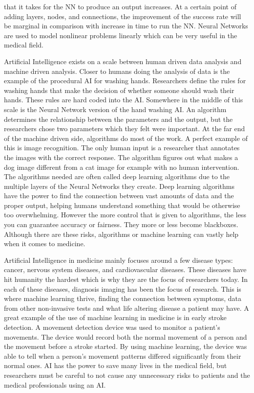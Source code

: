 \documentclass[]{article}
\begin{document}
that it takes for the NN to produce an output increases. At a certain point of adding layers, nodes, and connections, the improvement of the success rate will be marginal in comparison with increase in time to run the NN. Neural Networks are used to model nonlinear problems linearly which can be very useful in the medical field.\cite{introtoneuralnets}
		
		Artificial Intelligence exists on a scale between human driven data analysis and machine driven analysis. Closer to humans doing the analysis of data is the example of the procedural AI for washing hands. Researchers define the rules for washing hands that make the decision of whether someone should wash their hands. These rules are hard coded into the AI. Somewhere in the middle of this scale is the Neural Network version of the hand washing AI. An algorithm determines the relationship between the parameters and the output, but the researchers chose two parameters which they felt were important. At the far end of the machine driven side, algorithms do most of the work. A perfect example of this is image recognition. The only human input is a researcher that annotates the images with the correct response. The algorithm figures out what makes a dog image different from a cat image for example with no human intervention. The algorithms needed are often called deep learning algorithms due to the multiple layers of the Neural Networks they create. Deep learning algorithms have the power to find the connection between vast amounts of data and the proper output, helping humans understand something that would be otherwise too overwhelming. However the more control that is given to algorithms, the less you can guarantee accuracy or fairness. They more or less become blackboxes. Although there are these risks, algorithms or machine learning can vastly help when it comes to medicine.\cite{10.1001/jama.2017.18391}
		
		Artificial Intelligence in medicine mainly focuses around a few disease types: cancer, nervous system diseases, and cardiovascular diseases. These diseases have hit humanity the hardest which is why they are the focus of researchers today. In each of these diseases, diagnosis imaging has been the focus of research. This is where machine learning thrive, finding the connection between symptoms, data from other non-invasive tests and what life altering disease a patient may have. A great example of the use of machine learning in medicine is in early stroke detection. A movement detection device was used to monitor a patient's movements. The device would record both the normal movement of a person and the movement before a stroke started. By using machine learning, the device was able to tell when a person's movement patterns differed significantly from their normal ones. AI has the power to save many lives in the medical field, but researchers must be careful to not cause any unnecessary risks to patients and the medical professionals using an AI.\cite{Jiang230}
		
\end{document}

